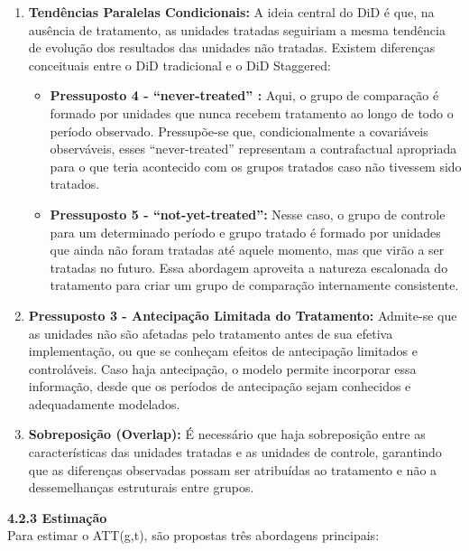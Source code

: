 \documentclass[
  brazilian,
  12pt,
  a4paper,
]{article}
\providecommand{\tightlist}{%
  \setlength{\itemsep}{0pt}\setlength{\parskip}{0pt}}
\begin{document}
\begin{enumerate}
\def\labelenumi{\arabic{enumi}.}
\tightlist
\item
  \textbf{Tendências Paralelas Condicionais:} A ideia central do DiD é
  que, na ausência de tratamento, as unidades tratadas seguiriam a mesma
  tendência de evolução dos resultados das unidades não tratadas.
  Existem diferenças conceituais entre o DiD tradicional e o DiD
  Staggered:

  \begin{itemize}
  \tightlist
  \item
    \textbf{Pressuposto 4 - ``never-treated'' :} Aqui, o grupo de
    comparação é formado por unidades que nunca recebem tratamento ao
    longo de todo o período observado. Pressupõe-se que,
    condicionalmente a covariáveis observáveis, esses ``never-treated''
    representam a contrafactual apropriada para o que teria acontecido
    com os grupos tratados caso não tivessem sido tratados.\\
  \item
    \textbf{Pressuposto 5 - ``not-yet-treated'':} Nesse caso, o grupo de
    controle para um determinado período e grupo tratado é formado por
    unidades que ainda não foram tratadas até aquele momento, mas que
    virão a ser tratadas no futuro. Essa abordagem aproveita a natureza
    escalonada do tratamento para criar um grupo de comparação
    internamente consistente.\\
  \end{itemize}
\item
  \textbf{Pressuposto 3 - Antecipação Limitada do Tratamento:} Admite-se
  que as unidades não são afetadas pelo tratamento antes de sua efetiva
  implementação, ou que se conheçam efeitos de antecipação limitados e
  controláveis. Caso haja antecipação, o modelo permite incorporar essa
  informação, desde que os períodos de antecipação sejam conhecidos e
  adequadamente modelados.\\
\item
  \textbf{Sobreposição (Overlap):} É necessário que haja sobreposição
  entre as características das unidades tratadas e as unidades de
  controle, garantindo que as diferenças observadas possam ser
  atribuídas ao tratamento e não a dessemelhanças estruturais entre
  grupos.
\end{enumerate}

\textbf{4.2.3 Estimação}\\
Para estimar o ATT(g,t), são propostas três abordagens principais:
\end{document}
